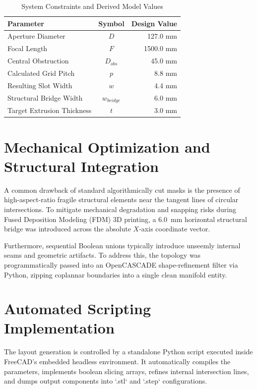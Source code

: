 \documentclass[11pt,a4paper]{article}
\begin{document}
\begin{table}[h]
\centering
\caption{System Constraints and Derived Model Values}
\label{tab:specs}
\begin{tabular}{lcr}
\toprule
\textbf{Parameter} & \textbf{Symbol} & \textbf{Design Value} \\
\midrule
Aperture Diameter & $D$ & 127.0 mm \\
Focal Length & $F$ & 1500.0 mm \\
Central Obstruction & $D_{obs}$ & 45.0 mm \\
Calculated Grid Pitch & $p$ & 8.8 mm \\
Resulting Slot Width & $w$ & 4.4 mm \\
Structural Bridge Width & $w_{bridge}$ & 6.0 mm \\
Target Extrusion Thickness & $t$ & 3.0 mm \\
\bottomrule
\end{tabular}
\end{table}

\section{Mechanical Optimization and Structural Integration}
A common drawback of standard algorithmically cut masks is the presence of high-aspect-ratio fragile structural elements near the tangent lines of circular intersections. To mitigate mechanical degradation and snapping risks during Fused Deposition Modeling (FDM) 3D printing, a 6.0~mm horizontal structural bridge was introduced across the absolute $X$-axis coordinate vector. 

Furthermore, sequential Boolean unions typically introduce unseemly internal seams and geometric artifacts. To address this, the topology was programmatically passed into an OpenCASCADE shape-refinement filter via Python, zipping coplannar boundaries into a single clean manifold entity.

\section{Automated Scripting Implementation}
The layout generation is controlled by a standalone Python script executed inside FreeCAD's embedded headless environment. It automatically compiles the parameters, implements boolean slicing arrays, refines internal intersection lines, and dumps output components into `.stl` and `.step` configurations.
\end{document}
